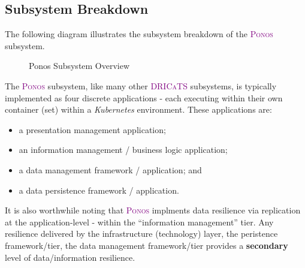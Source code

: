 \documentclass[a4paper]{book}
\newcommand{\dricats}{\textsc{\textcolor{Purple}{\small{DRICaTS }}}}
\newcommand{\ponos}{\textsc{\textcolor{Purple}{\small{Ponos }}}}
\begin{document}
\subsection{Subsystem Breakdown}

The following diagram illustrates the subsystem breakdown of the \ponos subsystem.

\begin{figure}[h!]
\begin{adjustbox}{max size={0.95\textwidth}{0.9\textheight}, center}
\end{adjustbox}
\caption{Ponos Subsystem Overview}
\label{fig:ponos-subsystem-overview}
\end{figure}

The \ponos subsystem, like many other \dricats subsystems, is typically implemented as four discrete applications - each executing within their own container (set) within a \textit{Kubernetes} environment. These applications are:
\begin{itemize}[noitemsep]
 \item a presentation management application;
 \item an information management / business logic application;
 \item a data management framework / application; and
 \item a data persistence framework / application.
\end{itemize}

It is also worthwhile noting that \ponos implments data resilience via replication at the application-level - within the ``information management'' tier. Any resilience delivered by the infrastructure (technology) layer, the peristence framework/tier, the data management framework/tier provides a \textbf{secondary} level of data/information resilience.
\end{document}
